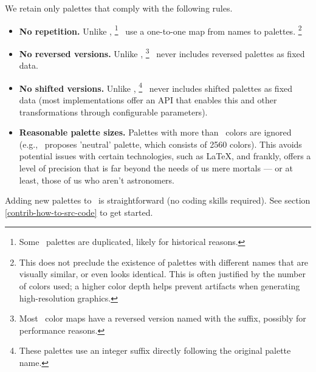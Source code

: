 \documentclass{tutodoc}
\begin{document}
We retain only palettes that comply with the following rules.
%
\begin{itemize}
    \item \textbf{No repetition.}
    Unlike \matplotlib,%
    \footnote{
        Some \matplotlib\ palettes are duplicated, likely for historical reasons.
    }
    \thisproj\ use a one-to-one map from names to palettes.%
    \footnote{
        This does not preclude the existence of palettes with different names that are visually similar, or even looks identical. This is often justified by the number of colors used; a higher color depth helps prevent artifacts when generating high-resolution graphics.
    }


    \item \textbf{No reversed versions.}
    Unlike \matplotlib,%
    \footnote{
    	Most \matplotlib\ color maps have a reversed version named with the  suffix, possibly for performance reasons.
    }
    \thisproj\ never includes reversed palettes as fixed data.


    \item \textbf{No shifted versions.}
    Unlike ,%
    \footnote{
    	These palettes use an integer suffix directly following the original palette name.
    }
    \thisproj\ never includes shifted palettes as fixed data (most implementations offer an API that enables this and other transformations through configurable parameters).


    \item \textbf{Reasonable palette sizes.} Palettes with more than \palMaxSize\ colors are ignored (e.g., \cmasher\ proposes 'neutral' palette, which consists of 2560 colors). 
    This avoids potential issues with certain technologies, such as \LaTeX, and frankly, offers a level of precision that is far beyond the needs of us mere mortals — or at least, those of us who aren't astronomers.
\end{itemize}




\begin{tdocnote}
    Adding new palettes to \thisproj\ is straightforward (no coding skills required).
    See section \ref{contrib-how-to-src-code} to get started.
\end{tdocnote}
\end{document}
